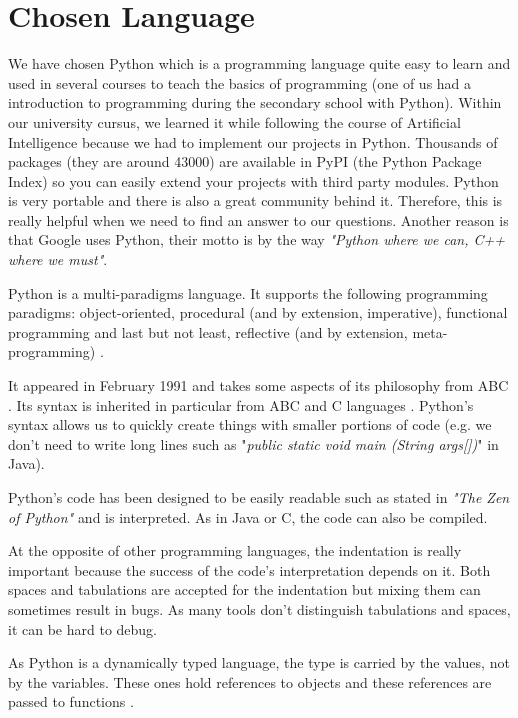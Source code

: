 \section{Chosen Language}
We have chosen Python which is a programming language quite easy to learn and used in several courses to teach the basics of programming (one of us had a introduction to programming during the secondary school with Python). Within our university cursus, we learned it while following the course of Artificial Intelligence because we had to implement our projects in Python. Thousands of packages (they are around 43000) are available in PyPI (the Python Package Index) so you can easily extend your projects with third party modules. Python is very portable and there is also a great community behind it. Therefore, this is really helpful when we need to find an answer to our questions. Another reason is that Google uses Python, their motto is by the way \textit{"Python where we can, C++ where we must"}.
\newline

Python is a multi-paradigms language. It supports the following programming paradigms: object-oriented, procedural (and by extension, imperative), functional programming and last but not least, reflective (and by extension, meta-programming) \cite{martelli2006python} \cite{python_doc_functional}.

It appeared in February 1991 and takes some aspects of its philosophy from ABC \cite{python_doc_why}. Its syntax is inherited in particular from ABC and C languages \cite{wikipediaEN_history_python}. Python's syntax allows us to quickly create things with smaller portions of code (e.g. we don't need to write long lines such as "\textit{public static void main (String args[])}" in Java).

Python's code has been designed to be easily readable such as stated in \textit{"The Zen of Python"} \cite{ZenPython} and is interpreted. As in Java or C, the code can also be compiled.

At the opposite of other programming languages, the indentation is really important because the success of the code's interpretation depends on it. Both spaces and tabulations are accepted for the indentation but mixing them can sometimes result in bugs. As many tools don't distinguish tabulations and spaces, it can be hard to debug.

As Python is a dynamically typed language, the type is carried by the values, not by the variables. These ones hold references to objects and these references are passed to functions \cite{wikipediaEN_python_syntax_semantics}.

